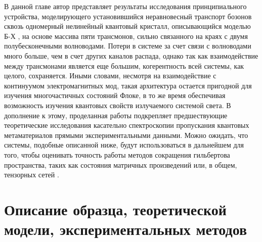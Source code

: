 \documentclass[14pt, a4paper]{extreport}
\numberwithin{equation}{section}
\begin{document}
В данной главе автор представляет результаты исследования принципиального устройства, моделирующего установившийся неравновесный транспорт бозонов сквозь одномерный нелинейный квантовый кристалл, описывающийся моделью Б-Х \cite{leib2010bose, Biella2015, mertz2016photonic, bychek2020open}, на основе массива пяти трансмонов, сильно связанного на краях с двумя полубесконечными волноводами. Потери в системе за счет связи с волноводами много больше, чем в счет других каналов распада, однако так как взаимодействие между трансмонами является еще большим, когерентность всей системы, как целого, сохраняется. Иными словами, несмотря на взаимодействие с континуумом электромагнитных мод, такая архитектура остается пригодной для изучения многочастичных состояний Флоке, в то же время обеспечивая возможность изучения квантовых свойств излучаемого системой света. В дополнение к этому, проделанная работы подкрепляет предшествующие теоретические исследования касательно спектроскопии пропускания квантовых метаматериалов \cite{Zagoskin2016, viehmann2013observing, Greenberg2015, Fistul2019,roberts2020driven,tiwari2020interplay} прямыми экспериментальными данными. Можно ожидать, что системы, подобные описанной ниже, будут использоваться в дальнейшем для того, чтобы оценивать точность работы методов сокращения гильбертова пространства, таких как состояния матричных произведений или, в общем, тензорных сетей \cite{Biella2015, orell2019probing, di2019efficient}.

\section{Описание образца, теоретической модели, экспериментальных методов}
\end{document}
